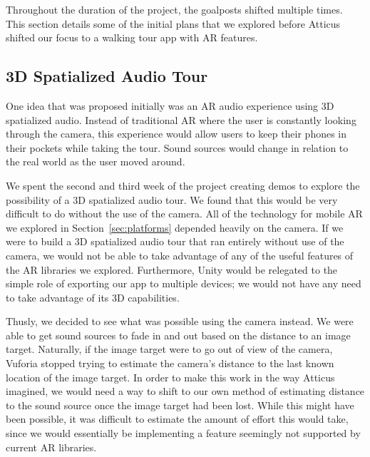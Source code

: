 \documentclass[a4paper, 10pt, american, titlepage]{article}
\begin{document}
Throughout the duration of the project, the goalposts shifted multiple times.
This section details some of the initial plans that we explored before Atticus
shifted our focus to a walking tour app with AR features.

\subsection{3D Spatialized Audio Tour}
\label{sec:3dSpatializedAudioTour}

One idea that was proposed initially was an AR audio experience using 3D
spatialized audio. Instead of traditional AR where the user is constantly
looking through the camera, this experience would allow users to keep their
phones in their pockets while taking the tour. Sound sources would change in
relation to the real world as the user moved around.

We spent the second and third week of the project creating demos to explore the
possibility of a 3D spatialized audio tour. We found that this would be very
difficult to do without the use of the camera. All of the technology for mobile
AR we explored in Section~\ref{sec:platforms} depended heavily on the camera. If
we were to build a 3D spatialized audio tour that ran entirely without use of
the camera, we would not be able to take advantage of any of the useful features
of the AR libraries we explored. Furthermore, Unity would be relegated to the
simple role of exporting our app to multiple devices; we would not have any need
to take advantage of its 3D capabilities.

Thusly, we decided to see what was possible using the camera instead. We were
able to get sound sources to fade in and out based on the distance to an image
target. Naturally, if the image target were to go out of view of the camera,
Vuforia stopped trying to estimate the camera's distance to the last known
location of the image target. In order to make this work in the way Atticus
imagined, we would need a way to shift to our own method of estimating distance
to the sound source once the image target had been lost. While this might have
been possible, it was difficult to estimate the amount of effort this would
take, since we would essentially be implementing a feature seemingly not
supported by current AR libraries.
\end{document}
